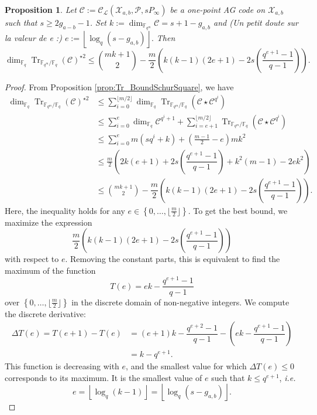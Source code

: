 \documentclass[a4paper]{article}
\newtheorem{proposition}[thm]{Proposition}
\theoremstyle{definition}
\theoremstyle{remark}
\newcommand{\calP}{\mathcal{P}}
\newcommand{\calL}{\mathcal{L}}
\newcommand{\calC}{\mathcal{C}}
\newcommand{\calX}{\mathcal{X}}
\newcommand{\fqm}{\mathbb{F}_{q^m}}
\newcommand{\fq}{\mathbb{F}_{q}}
\newcommand{\Tr}[1]{\operatorname{Tr}_{\mathbb{F}_{q^m}/\fq}\left(#1\right)}
\newcommand{\set}[1]{\left\{#1\right\}}
\begin{document}
\begin{proposition} \label{prop:bound_dim_using_inclusions}
    Let $\calC := \calC_{\calL}(\calX_{a,b},\calP,sP_{\infty})$ be a one-point AG code on $\calX_{a,b}$ such that $s \geq 2g_{a-b}-1$. Set $k := \dim_{\fqm}\calC = s+1-g_{a,b}$ and \color{red} (Un petit doute sur la valeur de e :) $e := \left\lfloor \log_q(s-g_{a,b})\right\rfloor.$ \color{black} Then
    $$\dim_{\fq} \Tr{\calC}^{\star2} \leq \binom{mk+1}{2} - \dfrac{m}{2}\left(k(k-1)(2e+1)-2s\left(\dfrac{q^{e+1}-1}{q-1}\right)\right).$$
\end{proposition}

\begin{proof}
    From Proposition \ref{prop:Tr_BoundSchurSquare}, we have 
    \begin{align*}
        \dim_{\fq} \Tr{\calC}^{\star2} 
        & \leq \sum\limits_{i=0}^{\lfloor m/2 \rfloor} \dim_{\fq} \Tr{\calC \star \calC^{q^i}} \\
        & \leq \sum\limits_{i=0}^{e} \dim_{\fq} \calC^{q^i+1} + \sum\limits_{i=e+1}^{\lfloor m/2 \rfloor} \Tr{\calC \star \calC^{q^i}} \\
        & \leq \sum\limits_{i=0}^{e} m(sq^i+k) + \left( \frac{m-1}{2} -e \right)mk^2 \\
        & \leq \frac{m}{2}\left(2k(e+1)+2s\left(\dfrac{q^{e+1}-1}{q-1}\right)+k^2(m-1)-2ek^2  \right) \\
        & \leq \binom{mk+1}{2} -  \dfrac{m}{2}\left(k(k-1)(2e+1)-2s\left(\dfrac{q^{e+1}-1}{q-1}\right)\right).
    \end{align*}
Here, the inequality holds for any $e \in \set{0,\dots,\lfloor \frac{m}{2} \rfloor}$. To get the best bound, we maximize the expression $$ \dfrac{m}{2}\left(k(k-1)(2e+1)-2s\left(\dfrac{q^{e+1}-1}{q-1}\right)\right)$$ with respect to $e$. \color{red} Removing the constant parts, this is equivalent to find the maximum of the function
$$T(e) = ek-\dfrac{q^{e+1}-1}{q-1}$$
over $\set{0,\dots,\lfloor \frac{m}{2} \rfloor}$ in the discrete domain of non-negative integers. \color{black} 
We compute the discrete derivative:
\begin{align*}
    \Delta T(e) = T(e+1)-T(e) &= (e+1)k-\dfrac{q^{e+2}-1}{q-1} - \left(ek-\dfrac{q^{e+1}-1}{q-1}\right) \\
                              &= k - q^{e+1}.
\end{align*}
This function is decreasing with $e$, and the smallest value for which $\Delta T(e) \leq 0$ corresponds to its maximum. It is the smallest value of $e$ such that $k \leq q^{e+1}$, \emph{i.e.}
$$e =  \left\lfloor \log_q(k-1)\right\rfloor = \left\lfloor \log_q(s-g_{a,b})\right\rfloor.$$
\end{proof}
\end{document}
